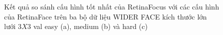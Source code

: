 {    \begin{figure}[H]
        \centering
        \caption{Kết quả so sánh cấu hình tốt nhất của RetinaFocus với các cấu hình của RetinaFace trên ba bộ dữ liệu WIDER FACE kích thước lớn lưới $3 X 3$ val easy (a), medium (b) và hard (c)}
        \label{fig:retinafocus_widerface_3k_val_rtnf}
    \end{figure}

}
